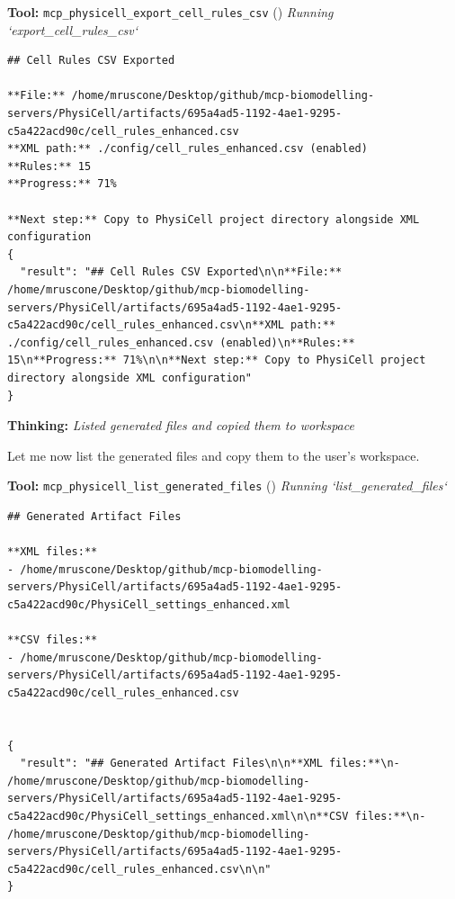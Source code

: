 \documentclass[11pt,a4paper]{article}
\begin{document}
\begin{toolokbox}
\textbf{Tool:} \texttt{mcp\_physicell\_export\_cell\_rules\_csv} (\checkmark)
\textit{Running `export\_cell\_rules\_csv`}
\begin{lstlisting}
## Cell Rules CSV Exported

**File:** /home/mruscone/Desktop/github/mcp-biomodelling-servers/PhysiCell/artifacts/695a4ad5-1192-4ae1-9295-c5a422acd90c/cell_rules_enhanced.csv
**XML path:** ./config/cell_rules_enhanced.csv (enabled)
**Rules:** 15
**Progress:** 71%

**Next step:** Copy to PhysiCell project directory alongside XML configuration
{
  "result": "## Cell Rules CSV Exported\n\n**File:** /home/mruscone/Desktop/github/mcp-biomodelling-servers/PhysiCell/artifacts/695a4ad5-1192-4ae1-9295-c5a422acd90c/cell_rules_enhanced.csv\n**XML path:** ./config/cell_rules_enhanced.csv (enabled)\n**Rules:** 15\n**Progress:** 71%\n\n**Next step:** Copy to PhysiCell project directory alongside XML configuration"
}
\end{lstlisting}
\end{toolokbox}
\begin{thinkbox}
\textbf{Thinking:} \textit{Listed generated files and copied them to workspace}

Let me now list the generated files and copy them to the user's workspace.

\end{thinkbox}
\begin{toolokbox}
\textbf{Tool:} \texttt{mcp\_physicell\_list\_generated\_files} (\checkmark)
\textit{Running `list\_generated\_files`}
\begin{lstlisting}
## Generated Artifact Files

**XML files:**
- /home/mruscone/Desktop/github/mcp-biomodelling-servers/PhysiCell/artifacts/695a4ad5-1192-4ae1-9295-c5a422acd90c/PhysiCell_settings_enhanced.xml

**CSV files:**
- /home/mruscone/Desktop/github/mcp-biomodelling-servers/PhysiCell/artifacts/695a4ad5-1192-4ae1-9295-c5a422acd90c/cell_rules_enhanced.csv


{
  "result": "## Generated Artifact Files\n\n**XML files:**\n- /home/mruscone/Desktop/github/mcp-biomodelling-servers/PhysiCell/artifacts/695a4ad5-1192-4ae1-9295-c5a422acd90c/PhysiCell_settings_enhanced.xml\n\n**CSV files:**\n- /home/mruscone/Desktop/github/mcp-biomodelling-servers/PhysiCell/artifacts/695a4ad5-1192-4ae1-9295-c5a422acd90c/cell_rules_enhanced.csv\n\n"
}
\end{lstlisting}
\end{toolokbox}
\end{document}
